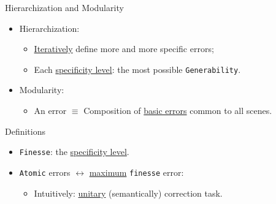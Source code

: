 \documentclass[10pt]{beamer}
\begin{document}
            \begin{frame}{Hierarchization and Modularity}
                \begin{itemize}[label=$\blacktriangleright$, font=\color{IGNGreen}, itemsep=2em]
                    \item<1-> Hierarchization:
                        \begin{itemize}[label=$\blacktriangleright$, font=\color{IGNGreen}, itemsep=2em]
                            \item<2-> \underline{Iteratively} define more and more specific errors;
                            \item<3-> Each \underline{specificity level}: the most possible \texttt{Generability}.
                        \end{itemize}
                    \item<4-> Modularity:
                        \begin{itemize}[label=$\blacktriangleright$, font=\color{IGNGreen}, itemsep=2em]
                            \item<5-> An error \(\equiv\) Composition of \underline{basic errors} common to all scenes.
                        \end{itemize}
                \end{itemize}
            \end{frame}

            \begin{frame}{Definitions}
                \begin{itemize}[label=$\blacktriangleright$, font=\color{IGNGreen}, itemsep=2em]
                    \item<1-> \texttt{Finesse}: the \underline{specificity level}.
                    \item<2-> \texttt{Atomic} errors \(\leftrightarrow\) \underline{maximum} \texttt{finesse} error:
                        \begin{itemize}
                            \item<3-> Intuitively: \underline{unitary} (semantically) correction task.
                        \end{itemize}
                \end{itemize}
            \end{frame}
        
\end{document}
